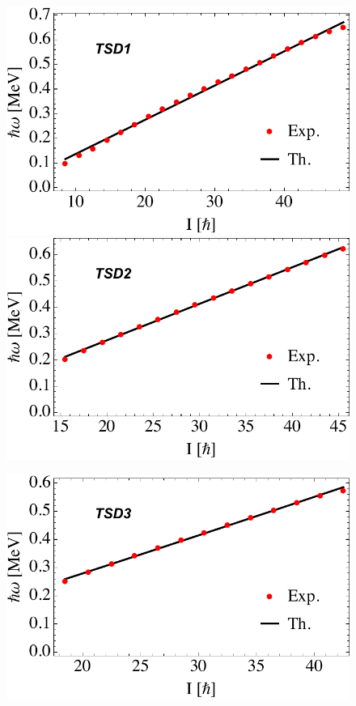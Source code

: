 \documentclass[myclassdoc,debug]{rjparticle}
\begin{document}
\begin{figure}
\centering
\begin{minipage}{.5\textwidth}
  \centering
  \includegraphics[scale=0.44]{sub-paper1/figs/hrot_tsd1.pdf}
  \includegraphics[scale=0.44]{sub-paper1/figs/hrot_tsd2.pdf}
\end{minipage}%
\begin{minipage}{.5\textwidth}
  \centering
 \includegraphics[scale=0.44]{sub-paper1/figs/hrot_tsd3.pdf}

\end{minipage}
\end{figure}
\end{document}
